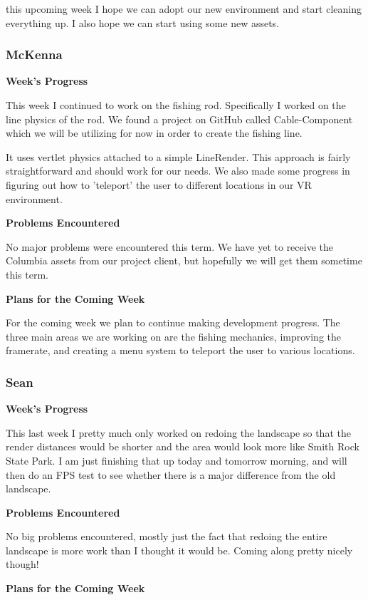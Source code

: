 \documentclass[10pt,journal,compsoc,onecolumn, draftclsnofoot]{IEEEtran}
\begin{document}
this upcoming week I hope we can adopt our new environment and start cleaning everything up. I also hope we can start using some new assets.

\subsubsection{McKenna}
\noindent \textbf{Week's Progress}

This week I continued to work on the fishing rod. Specifically I worked on the line physics of the rod. We found a project on GitHub called Cable-Component which we will be utilizing for now in order to create the fishing line.

It uses vertlet physics attached to a simple LineRender. This approach is fairly straightforward and should work for our needs. We also made some progress in figuring out how to 'teleport' the user to different locations in our VR environment.

\noindent \textbf{Problems Encountered}

No major problems were encountered this term. We have yet to receive the Columbia assets from our project client, but hopefully we will get them sometime this term.

\noindent \textbf{Plans for the Coming Week}

For the coming week we plan to continue making development progress. The three main areas we are working on are the fishing mechanics, improving the framerate, and creating a menu system to teleport the user to various locations.

\subsubsection{Sean}
\noindent \textbf{Week's Progress}

This last week I pretty much only worked on redoing the landscape so that the render distances would be shorter and the area would look more like Smith Rock State Park. I am just finishing that up today and tomorrow morning, and will then do an FPS test to see whether there is a major difference from the old landscape.

\noindent \textbf{Problems Encountered}

No big problems encountered, mostly just the fact that redoing the entire landscape is more work than I thought it would be. Coming along pretty nicely though!

\noindent \textbf{Plans for the Coming Week}
\end{document}
